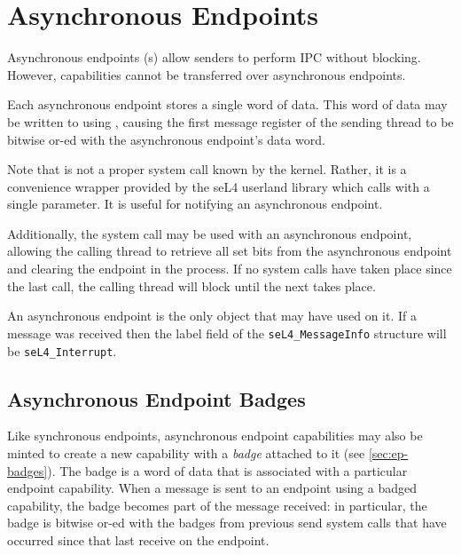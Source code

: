 \section{Asynchronous Endpoints}

Asynchronous endpoints (s)
allow senders to perform IPC without blocking.
However, capabilities cannot be transferred over asynchronous endpoints.

Each asynchronous endpoint stores a single word of data. This word of
data may be written to using , causing the
first message register of the sending thread to be bitwise or-ed with
the asynchronous endpoint's data word.

Note that  is not a proper system call
known by the kernel. Rather, it is a convenience
wrapper provided by the seL4 userland library which calls
 with a single parameter. It is
useful for notifying an asynchronous endpoint.

Additionally, the  system call may be used with an
asynchronous endpoint, allowing the calling thread to retrieve all set
bits from the asynchronous endpoint and clearing the endpoint in the
process. If no  system calls have taken place since the last
 call, the calling thread will block until the next
 takes place.

An asynchronous endpoint is the only object that may have
 used on it. If a message was received then the
label field of the \texttt{seL4\_MessageInfo} structure will be
\texttt{seL4\_Interrupt}.

\subsection{Asynchronous Endpoint Badges}

Like synchronous endpoints, asynchronous endpoint capabilities may also
be minted to create a new capability with a \emph{badge} attached to it (see \autoref{sec:ep-badges}).
The badge is a word of data that is associated with a particular
endpoint capability. When a message is sent to an endpoint using
a badged capability, the badge becomes part of the message received: in
particular, the badge is bitwise or-ed with the badges from
previous send system calls that have occurred since that last receive
on the endpoint.


